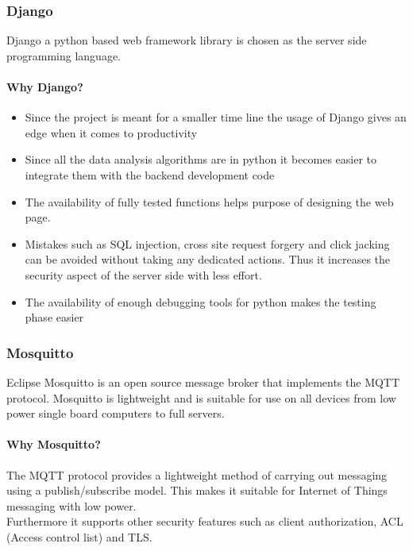 \documentclass{report}
\begin{document}
\subsubsection{Django}
Django a python based web framework library is chosen as the server side programming language.

\paragraph{Why Django?}

\begin{itemize}
    \item Since the project is meant for a smaller time line the usage of Django gives an edge when it comes to productivity
    
    \item Since all the data analysis algorithms are in python it becomes easier to integrate them with the backend development code
    
    \item The availability of fully tested functions helps purpose of designing the web page.
    
    \item Mistakes such as SQL injection, cross site request forgery and click jacking can be avoided without taking any dedicated actions. Thus it increases the security aspect of the server side with less effort.
    
    \item The availability of enough debugging tools for python  makes the testing phase easier 
\end{itemize}

\subsubsection{Mosquitto}
Eclipse Mosquitto is an open source message broker that implements the MQTT protocol. Mosquitto is lightweight and is suitable for use on all devices from low power single board computers to full servers.

\paragraph{Why Mosquitto?} %
The MQTT protocol provides a lightweight method of carrying out messaging using a publish/subscribe model. This makes it suitable for Internet of Things messaging with low power.\\
Furthermore it supports other security features such as client authorization, ACL (Access control list) and TLS.
\end{document}
